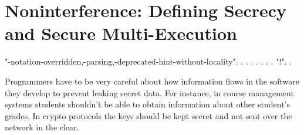 \documentclass[12pt]{report}
\begin{document}

\begin{coqdoccode}
\end{coqdoccode}
\section{Noninterference: Defining Secrecy and Secure Multi-Execution}


\begin{coqdoccode}
\coqdocemptyline
\coqdocnoindent
{}  "-notation-overridden,-parsing,-deprecated-hint-without-locality".\coqdoceol
\coqdocnoindent
{}    .\coqdoceol
\coqdocnoindent
{}    .\coqdoceol
\coqdocnoindent
{}    .\coqdoceol
\coqdocnoindent
{}    .  .\coqdoceol
\coqdocnoindent
{}    .\coqdoceol
\coqdocnoindent
{}    .\coqdoceol
\coqdocnoindent
{}    "!".\coqdoceol
\coqdocemptyline
\coqdocnoindent
{}    .\coqdoceol
\coqdocemptyline
\end{coqdoccode}
Programmers have to be very careful about how information flows in
    the software they develop to prevent leaking secret data. For
    instance, in course management systems students shouldn't be able
    to obtain information about other student's grades. In crypto
    protocols the keys should be kept secret and not sent over the
    network in the clear. 
\end{document}
